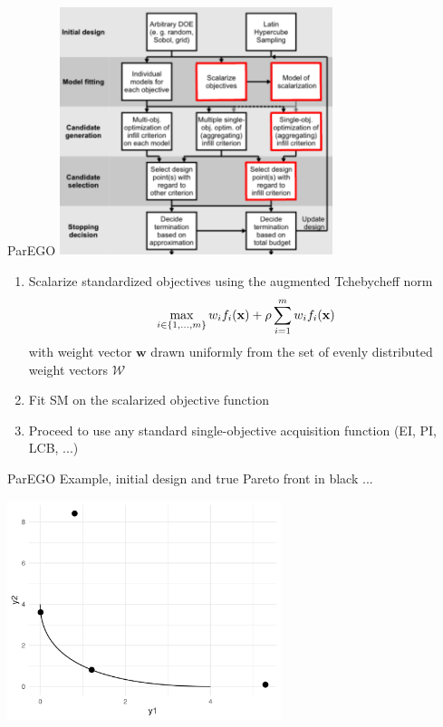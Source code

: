 \documentclass[11pt,compress,t,notes=noshow, xcolor=table]{beamer}
\begin{document}
\begin{vbframe}{ParEGO}
\centering
\includegraphics[width = 0.6\textwidth]{figure_man/FlowchartMBMO_parego.pdf}
\framebreak

\begin{enumerate}
  \item Scalarize standardized objectives using the augmented Tchebycheff norm
  \begin{equation*}
  \label{eq:tcheby}
  \max\limits_{i \in \{1, \ldots, m\}} w_i f_i(\mathbf{x}) + \rho \sum\limits_{i = 1}^m w_i f_i(\mathbf{x})
  \end{equation*}
  with weight vector $\mathbf{w}$ drawn uniformly from the set of evenly distributed weight vectors $\mathcal{W}$
  \item Fit SM on the scalarized objective function
  \item Proceed to use any standard single-objective acquisition function (EI, PI, LCB, ...)
\end{enumerate}

\framebreak
ParEGO Example, initial design and true Pareto front in black ...
\vspace{1cm}
\begin{center}
  \includegraphics[width = 0.6\textwidth]{figure_man/multicrit_2.png}
\end{center}


\end{vbframe}
\end{document}

